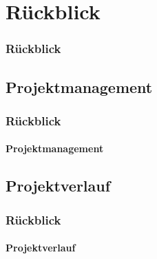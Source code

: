\section{Rückblick}

\author{Erivn Mazlagi\'c}

\begin{frame}
	\frametitle{Rückblick\hfill{}\footnotesize \group}
	
\end{frame}

\subsection{Projektmanagement}
\begin{frame}
	\frametitle{Rückblick\hfill{}\footnotesize \group}
	\framesubtitle{Projektmanagement}
\end{frame}

\subsection{Projektverlauf}
\begin{frame}
	\frametitle{Rückblick\hfill{}\footnotesize \group}
	\framesubtitle{Projektverlauf}
\end{frame}

